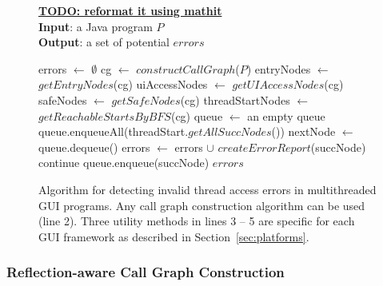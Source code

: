 \begin{figure}[t]
\textbf{\underline{TODO: reformat it using mathit}}\\
\textbf{Input}: a Java program $P$\\
\textbf{Output}: a set of potential $errors$\\
\vspace{-5mm}
\begin{algorithmic}[1]
\STATE errors $\leftarrow$ $\emptyset$
\STATE cg $\leftarrow$ $constructCallGraph$($P$)
\STATE entryNodes $\leftarrow$ $getEntryNodes$(cg)
\STATE uiAccessNodes $\leftarrow$ $getUIAccessNodes$(cg)
\STATE safeNodes $\leftarrow$ $getSafeNodes$(cg)
\STATE threadStartNodes $\leftarrow$ $getReachableStartsByBFS$(cg)
\STATE queue $\leftarrow$ an empty queue
\STATE queue.enqueueAll(threadStart.$getAllSuccNodes$())
\STATE nextNode $\leftarrow$ queue.dequeue()
\STATE errors $\leftarrow$ errors $\cup$ $createErrorReport$(succNode)
\STATE continue
\ELSE
\STATE queue.enqueue(succNode)
\ENDIF 
\ENDFOR
\ENDWHILE
\ENDFOR
\ENDFOR
\RETURN $errors$
\vspace{-2mm}
\end{algorithmic}
\caption{Algorithm for detecting invalid thread access errors in multithreaded GUI programs. 
Any call graph construction algorithm can be used (line 2).
Three utility methods in lines 3 -- 5 are specific for each GUI framework
 as described in Section~\ref{sec:platforms}.
} \label{fig:detectalgorithm}
\end{figure}


\subsubsection{Reflection-aware Call Graph Construction}
\label{sec:cg}

% 

